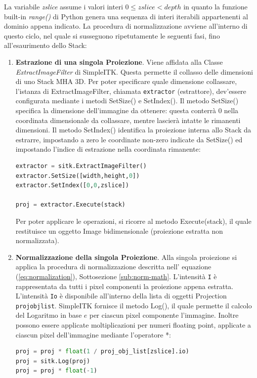 \documentclass[a4paper,12pt, doubleside]{report}
\begin{document}
                La variabile \textit{zslice} assume i valori interi $0 \leq zslice < depth$ in quanto la funzione built-in \textit{range()} \cite{python-range} di Python genera una sequenza di interi iterabili appartenenti al dominio appena indicato. La procedura di normalizzazione avviene all'interno di questo ciclo, nel quale si susseguono ripetutamente le seguenti fasi, fino all'esaurimento dello Stack:
                
                \begin{enumerate}
                    \item \textbf{Estrazione di una singola Proiezione}. Viene affidata alla Classe \textit{ExtractImageFilter} \cite{sitk-estractor} di SimpleITK. Questa permette il collasso delle dimensioni di uno Stack MHA 3D. Per poter specificare quale dimensione collassare, l'istanza di ExtractImageFilter, chiamata \texttt{extractor} (estrattore), dev'essere configurata mediante i metodi SetSize() e SetIndex(). Il metodo SetSize() specifica la dimensione dell'immagine da ottenere: questa conterrà $0$ nella coordinata dimensionale da collassare, mentre lascierà intatte le rimanenti dimensioni. Il metodo SetIndex() identifica la proiezione interna allo Stack da estrarre, impostando a zero le coordinate non-zero indicate da SetSize() ed impostando l'indice di estrazione nella coordinata rimanente:
                    
                    \begin{lstlisting}[language=python, frame=bt]
extractor = sitk.ExtractImageFilter()
extractor.SetSize([width,height,0])
extractor.SetIndex([0,0,zslice])

proj = extractor.Execute(stack)
                    \end{lstlisting} 
                    
                    Per poter applicare le operazioni, si ricorre al metodo Execute(stack), il quale restituisce un oggetto Image bidimensionale (proiezione estratta non normalizzata).
                    
                    \item \textbf{Normalizzazione della singola Proiezione}. Alla singola proiezione si applica la procedura di normalizzazione descritta nell' equazione (\ref{eq:normalization}), Sottosezione \ref{sub:norm-math}. L'intensità \texttt{I} è rappresentata da tutti i pixel componenti la proiezione appena estratta. L'intensità \texttt{Io} è disponibile all'interno della lista di oggetti Projection \texttt{proj\textunderscore obj\textunderscore list}. SimpleITK fornisce il metodo Log()\cite{sitk-log}, il quale permette il calcolo del Logaritmo in base $e$ per ciascun pixel componente l'immagine. Inoltre possono essere applicate moltiplicazioni per numeri floating point, applicate a ciascun pixel dell'immagine mediante l'operatore *:
                    \begin{lstlisting}[language=python, frame=bt]
proj = proj * float(1 / proj_obj_list[zslice].io)
proj = sitk.Log(proj)
proj = proj * float(-1)
                    \end{lstlisting} 
                    

\end{enumerate}
\end{document}
